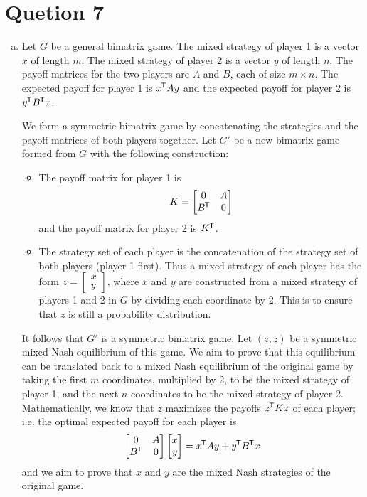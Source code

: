 \documentclass[a4paper,12pt]{article}
\theoremstyle{definition}
\newcommand*{\tran}{^{\mkern-1.5mu\mathsf{T}}}
\begin{document}
\section*{Quetion 7}
\begin{enumerate}[(a)]
\item Let $G$ be a general bimatrix game. The mixed strategy of player 1 is a vector $x$ of length $m$. The mixed strategy of player 2 is a vector $y$ of length $n$. The payoff matrices for the two players are $A$ and $B$, each of size $m \times n$. The expected payoff for player 1 is $x\tran Ay$ and the expected payoff for player 2 is $y\tran B\tran x$.

We form a symmetric bimatrix game by concatenating the strategies and the payoff matrices of both players together. 
Let $G'$ be a new bimatrix game formed from $G$ with the following construction:
\begin{itemize}
	\item The payoff matrix for player 1 is
	\begin{align*}
		K = \left[
		\begin{matrix}
		0 & A\\
		B\tran & 0
		\end{matrix}\right]		
	\end{align*}
	and the payoff matrix for player 2 is $K\tran$.
	\item The strategy set of each player is the concatenation of the strategy set of both players (player 1 first). Thus a mixed strategy of each player has the form $z = \left[\begin{matrix}  x \\ y \end{matrix}\right]$, where $x$ and $y$ are constructed from a mixed strategy of players 1 and 2 in $G$ by dividing each coordinate by 2. This is to ensure that $z$ is still a probability distribution.	
\end{itemize}
It follows that $G'$ is a symmetric bimatrix game. Let $(z, z)$ be a symmetric mixed Nash equilibrium of this game. We aim to prove that this equilibrium can be translated back to a mixed Nash equilibrium of the original game by taking the first $m$ coordinates, multiplied by 2, to be the mixed strategy of player 1, and the next $n$ coordinates to be the mixed strategy of player 2. Mathematically, we know that $z$ maximizes the payoffs $z\tran Kz$ of each player; i.e. the optimal expected payoff for each player is
\begin{align*}
	[x\tran \quad y\tran]\left[\begin{matrix}0 & A\\ B\tran & 0\end{matrix}\right]
		\left[\begin{matrix}x\\y\end{matrix}\right] = x\tran A y + y\tran B\tran x
\end{align*}
and we aim to prove that $x$ and $y$ are the mixed Nash strategies of the original game.


\end{enumerate}
\end{document}
